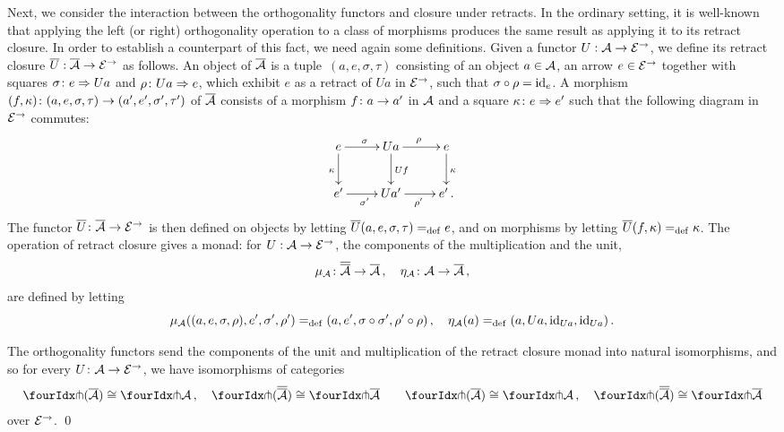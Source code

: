 \documentclass[reqno,10pt,a4paper,oneside]{amsart}
\begin{document}
Next, we consider the interaction between the orthogonality functors and closure under retracts. In the ordinary setting, it is well-known that
applying the left (or right) orthogonality operation to a class of morphisms produces the same result as applying it to its retract closure. 
In order to establish a counterpart of this fact, we need again some definitions. 
Given a  functor $U : \cal{A} \to \catE^{\to}$, we define its retract closure $\overline{U} : \overline{\cal{A}} \to \catE^{\to}$ as follows. 
An object of $\overline{\cal{A}}$ is a tuple~$(a, e, \sigma, \tau)$ consisting of an object $a \in \cal{A}$, an arrow $e \in \cal{E}^\to$ together with squares $\sigma \co e \Rightarrow Ua$ and $\rho \co Ua \Rightarrow e$,
which exhibit $e$ as a retract of $U a$ in  $\catE^{\to}$,  \ie such that $\sigma \cc \rho = \id_e$. 
A morphism $(f, \kappa) \co (a, e, \sigma, \tau) \to (a', e', \sigma', \tau')$ of $\overline{\cal{A}}$  consists of a morphism $f \co a \to a'$ in $\cal{A}$ and a square $\kappa \co e \Rightarrow e'$  such that the following diagram in $\cal{E}^\to$ commutes:
\[
\xymatrix{
  e
  \ar[r]^{\sigma}
    \ar[d]_{\kappa}
&
  U a
  \ar[r]^{\rho}
  \ar[d]^{U f}
&
  e
  \ar[d]^{\kappa}
\\
  e'
  \ar[r]_{\sigma'}
&
  Ua'
  \ar[r]_{\rho'}
&
  e' \, .
}
\]
The functor $\overline{U} \co \overline{\cal{A}} \to \catE^\to$ is then defined  on objects  by letting $\overline{U}(a, e, \sigma, \tau) \defeq e$,
and on morphisms by letting $\overline{U}(f, \kappa) \defeq \kappa$. The operation of retract closure gives a monad: for $U : \cal{A} \to \catE^{\to}$,
the components of the multiplication and the unit, 
\[
\mu_\cal{A} \co \overline{\overline{\cal{A}}} \to \overline{\cal{A}} \, , \quad
\eta_\cal{A} \co \cal{A} \to \overline{\cal{A}} \, ,
\]
are defined by letting
\[
\mu_\cal{A}((a, e, \sigma,  \rho), e', \sigma', \rho') \defeq (a, e', \sigma \cc \sigma', \rho' \cc \rho) \, , \quad
\eta_\cal{A}(a) \defeq (a, Ua, \id_{Ua}, \id_{Ua}) \, .
\]




\begin{lemma}
\label{retract-closure}
The orthogonality functors send the components of the unit and multiplication of the retract closure monad into natural
isomorphisms, and so for every $U \co \cal{A} \to \catE^\to$, we have isomorphisms of categories
\begin{gather*} 
 \liftr{(\overline{\cal{A}})} \iso \liftr{\cal{A}} \, , \quad
 \liftr{(\overline{\overline{\cal{A}}})} \iso \liftr{\overline{\cal{A}}}  \qquad
 \liftl{(\overline{\cal{A}})} \iso \liftl{\cal{A}} \, , \quad
 \liftl{(\overline{\overline{\cal{A}}})} \iso \liftl{\overline{\cal{A}}}
\end{gather*} 
over $\catE^\to$. \qed
\end{lemma}
\end{document}
